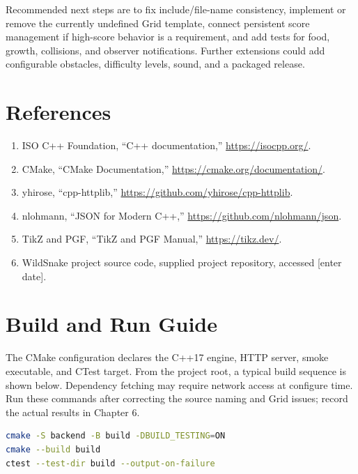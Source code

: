 \documentclass[12pt,a4paper]{report}
\begin{document}
Recommended next steps are to fix include/file-name consistency, implement or
remove the currently undefined Grid template, connect persistent score
management if high-score behavior is a requirement, and add tests for food,
growth, collisions, and observer notifications. Further extensions could add
configurable obstacles, difficulty levels, sound, and a packaged release.

\chapter*{References}
\begin{enumerate}[leftmargin=*]
  \item ISO C++ Foundation, ``C++ documentation,'' \url{https://isocpp.org/}.
  \item CMake, ``CMake Documentation,'' \url{https://cmake.org/documentation/}.
  \item yhirose, ``cpp-httplib,'' \url{https://github.com/yhirose/cpp-httplib}.
  \item nlohmann, ``JSON for Modern C++,'' \url{https://github.com/nlohmann/json}.
  \item TikZ and PGF, ``TikZ and PGF Manual,'' \url{https://tikz.dev/}.
  \item WildSnake project source code, supplied project repository, accessed
        [enter date].
\end{enumerate}

\appendix
\chapter{Build and Run Guide}
The CMake configuration declares the C++17 engine, HTTP server, smoke
executable, and CTest target. From the project root, a typical build sequence
is shown below. Dependency fetching may require network access at configure
time. Run these commands after correcting the source naming and Grid issues;
record the actual results in Chapter 6.
\begin{lstlisting}[language=bash,basicstyle=\ttfamily\small]
cmake -S backend -B build -DBUILD_TESTING=ON
cmake --build build
ctest --test-dir build --output-on-failure
\end{lstlisting}
\end{document}
